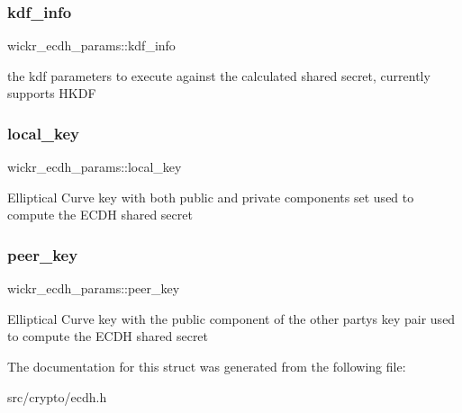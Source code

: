 \subsubsection{\texorpdfstring{kdf\+\_\+info}{kdf\_info}}
{\footnotesize\ttfamily wickr\+\_\+ecdh\+\_\+params\+::kdf\+\_\+info}

the kdf parameters to execute against the calculated shared secret, currently supports H\+K\+DF \mbox{\label{structwickr__ecdh__params_aab5a55e6a516ab8268ef6739ae1422cd}} 
\subsubsection{\texorpdfstring{local\+\_\+key}{local\_key}}
{\footnotesize\ttfamily wickr\+\_\+ecdh\+\_\+params\+::local\+\_\+key}

Elliptical Curve key with both public and private components set used to compute the E\+C\+DH shared secret \mbox{\label{structwickr__ecdh__params_ab17d6191b23fa7fd1befd03b2eee4ba9}} 
\subsubsection{\texorpdfstring{peer\+\_\+key}{peer\_key}}
{\footnotesize\ttfamily wickr\+\_\+ecdh\+\_\+params\+::peer\+\_\+key}

Elliptical Curve key with the public component of the other party\textquotesingle{}s key pair used to compute the E\+C\+DH shared secret 

The documentation for this struct was generated from the following file\+:\begin{DoxyCompactItemize}
\item 
src/crypto/ecdh.\+h\end{DoxyCompactItemize}
